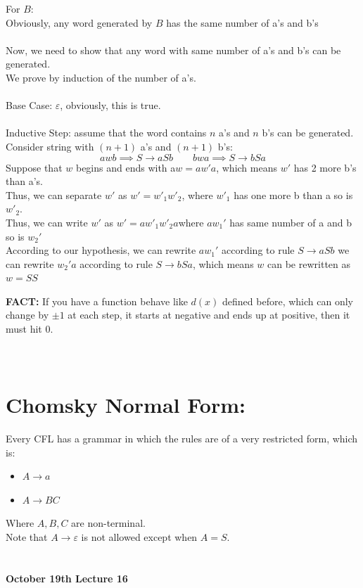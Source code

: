 \documentclass[11pt]{article}
\begin{document}
\begin{mdframed}
For $B$:\\
Obviously, any word generated by $B$ has the same number of a's and b's\\
\\
Now, we need to show that any word with same number of a's and b's can be generated.\\
We prove by induction of the number of a's.\\\\
Base Case: $\varepsilon$, obviously, this is true.\\\\
Inductive Step: assume that the word contains $n$ a's and $n$ b's can be generated.\\	
Consider string with $(n+1)$ a's and  $(n+1)$ b's:\\
$$ awb \implies S\to aSb \quad\quad bwa \implies S\to bSa $$
Suppose that $w$ begins and ends with a\quad $w = a w' a$, which means $w'$ has 2 more b's than a's.\\
Thus, we can separate $w'$ as $w' = w'_1 w'_2$, where $w'_1$ has one more b than a so is $w'_2$.\\
Thus, we can write $w'$ as $w' = a w'_1 w'_2 a$\quad\quad where $aw_1'$ has same number of a and b so is $w_2'$\\
According to our hypothesis, we can rewrite $aw_1'$ according to rule $S \to aSb$
we can rewrite $w_2'a$ according to rule $S \to bSa$, 
which means $w$ can be rewritten as $w = SS$

\end{mdframed}

\textbf{FACT:} If you have a function behave like $d(x)$ defined before, which can only change by $\pm 1$ at each step, it starts at negative and ends up at positive, then it must hit 0.\\
\\
\\





\section*{Chomsky Normal Form:}
Every CFL has a grammar in which the rules are of a very restricted form, which is:	
\begin{itemize}
	\item $A \to a$
	\item $A \to BC$
\end{itemize}
Where $A, B, C$ are non-terminal.\\
Note that $A\to \varepsilon $ is not allowed except when $A=S$.\\
\\
\\
\textbf{October 19th Lecture 16}
\end{document}

